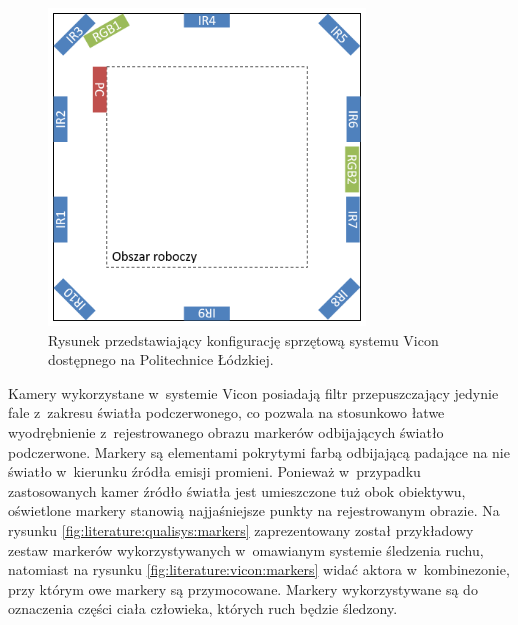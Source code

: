 \begin{savenotes}
		
	\begin{figure}[!htp]
		\centering	
		\includegraphics[width=0.75\textwidth]{images/viconSetup.png}
		\caption{Rysunek przedstawiający konfigurację sprzętową systemu Vicon dostępnego na Politechnice Łódzkiej.}
		\label{fig:literature:vicon:lutSetup}
	\end{figure}
	
\end{savenotes}
	
Kamery wykorzystane w~systemie Vicon posiadają filtr przepuszczający jedynie fale z~zakresu światła podczerwonego, co pozwala na stosunkowo łatwe wyodrębnienie z~rejestrowanego obrazu markerów odbijających światło podczerwone. Markery są elementami pokrytymi farbą odbijającą padające na nie światło w~kierunku źródła emisji promieni. Ponieważ w~przypadku zastosowanych kamer źródło światła jest umieszczone tuż obok obiektywu, oświetlone markery stanowią najjaśniejsze punkty na rejestrowanym obrazie. Na rysunku \ref{fig:literature:qualisys:markers} zaprezentowany został przykładowy zestaw markerów wykorzystywanych w~omawianym systemie śledzenia ruchu, natomiast na rysunku \ref{fig:literature:vicon:markers} widać aktora w~kombinezonie, przy którym owe markery są przymocowane. Markery wykorzystywane są do oznaczenia części ciała człowieka, których ruch będzie śledzony.
	
